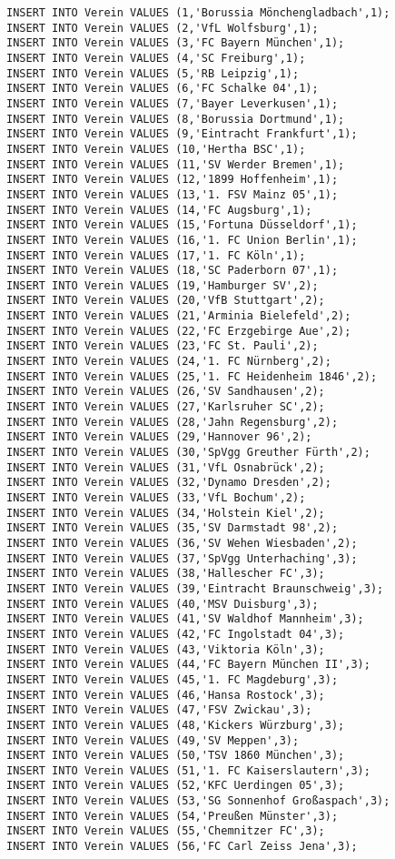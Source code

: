 \documentclass{lehramt-informatik-aufgabe}
\begin{document}
\begin{verbatim}
INSERT INTO Verein VALUES (1,'Borussia Mönchengladbach',1);
INSERT INTO Verein VALUES (2,'VfL Wolfsburg',1);
INSERT INTO Verein VALUES (3,'FC Bayern München',1);
INSERT INTO Verein VALUES (4,'SC Freiburg',1);
INSERT INTO Verein VALUES (5,'RB Leipzig',1);
INSERT INTO Verein VALUES (6,'FC Schalke 04',1);
INSERT INTO Verein VALUES (7,'Bayer Leverkusen',1);
INSERT INTO Verein VALUES (8,'Borussia Dortmund',1);
INSERT INTO Verein VALUES (9,'Eintracht Frankfurt',1);
INSERT INTO Verein VALUES (10,'Hertha BSC',1);
INSERT INTO Verein VALUES (11,'SV Werder Bremen',1);
INSERT INTO Verein VALUES (12,'1899 Hoffenheim',1);
INSERT INTO Verein VALUES (13,'1. FSV Mainz 05',1);
INSERT INTO Verein VALUES (14,'FC Augsburg',1);
INSERT INTO Verein VALUES (15,'Fortuna Düsseldorf',1);
INSERT INTO Verein VALUES (16,'1. FC Union Berlin',1);
INSERT INTO Verein VALUES (17,'1. FC Köln',1);
INSERT INTO Verein VALUES (18,'SC Paderborn 07',1);
INSERT INTO Verein VALUES (19,'Hamburger SV',2);
INSERT INTO Verein VALUES (20,'VfB Stuttgart',2);
INSERT INTO Verein VALUES (21,'Arminia Bielefeld',2);
INSERT INTO Verein VALUES (22,'FC Erzgebirge Aue',2);
INSERT INTO Verein VALUES (23,'FC St. Pauli',2);
INSERT INTO Verein VALUES (24,'1. FC Nürnberg',2);
INSERT INTO Verein VALUES (25,'1. FC Heidenheim 1846',2);
INSERT INTO Verein VALUES (26,'SV Sandhausen',2);
INSERT INTO Verein VALUES (27,'Karlsruher SC',2);
INSERT INTO Verein VALUES (28,'Jahn Regensburg',2);
INSERT INTO Verein VALUES (29,'Hannover 96',2);
INSERT INTO Verein VALUES (30,'SpVgg Greuther Fürth',2);
INSERT INTO Verein VALUES (31,'VfL Osnabrück',2);
INSERT INTO Verein VALUES (32,'Dynamo Dresden',2);
INSERT INTO Verein VALUES (33,'VfL Bochum',2);
INSERT INTO Verein VALUES (34,'Holstein Kiel',2);
INSERT INTO Verein VALUES (35,'SV Darmstadt 98',2);
INSERT INTO Verein VALUES (36,'SV Wehen Wiesbaden',2);
INSERT INTO Verein VALUES (37,'SpVgg Unterhaching',3);
INSERT INTO Verein VALUES (38,'Hallescher FC',3);
INSERT INTO Verein VALUES (39,'Eintracht Braunschweig',3);
INSERT INTO Verein VALUES (40,'MSV Duisburg',3);
INSERT INTO Verein VALUES (41,'SV Waldhof Mannheim',3);
INSERT INTO Verein VALUES (42,'FC Ingolstadt 04',3);
INSERT INTO Verein VALUES (43,'Viktoria Köln',3);
INSERT INTO Verein VALUES (44,'FC Bayern München II',3);
INSERT INTO Verein VALUES (45,'1. FC Magdeburg',3);
INSERT INTO Verein VALUES (46,'Hansa Rostock',3);
INSERT INTO Verein VALUES (47,'FSV Zwickau',3);
INSERT INTO Verein VALUES (48,'Kickers Würzburg',3);
INSERT INTO Verein VALUES (49,'SV Meppen',3);
INSERT INTO Verein VALUES (50,'TSV 1860 München',3);
INSERT INTO Verein VALUES (51,'1. FC Kaiserslautern',3);
INSERT INTO Verein VALUES (52,'KFC Uerdingen 05',3);
INSERT INTO Verein VALUES (53,'SG Sonnenhof Großaspach',3);
INSERT INTO Verein VALUES (54,'Preußen Münster',3);
INSERT INTO Verein VALUES (55,'Chemnitzer FC',3);
INSERT INTO Verein VALUES (56,'FC Carl Zeiss Jena',3);


\end{verbatim}
\end{document}
